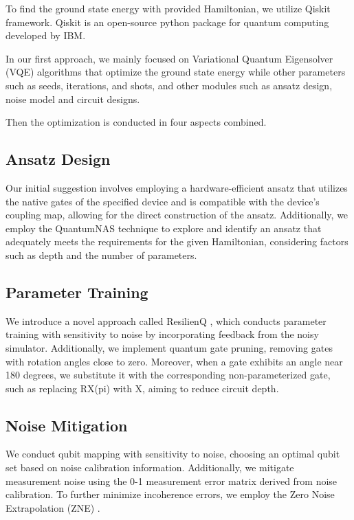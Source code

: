 \documentclass{article}
\begin{document}
To find the ground state energy with provided Hamiltonian, we utilize Qiskit framework. Qiskit is an open-source python package for quantum computing developed by IBM. 

In our first approach, we mainly focused on Variational Quantum Eigensolver (VQE) algorithms that optimize the ground state energy while other parameters such as seeds, iterations, and shots, and other modules such as ansatz design, noise model and circuit designs.

Then the optimization is conducted in four aspects combined. 

\subsection{Ansatz Design}
Our initial suggestion involves employing a hardware-efficient ansatz that utilizes the native gates of the specified device and is compatible with the device's coupling map, allowing for the direct construction of the ansatz. Additionally, we employ the QuantumNAS \cite{QuantumNAS2022} technique to explore and identify an ansatz that adequately meets the requirements for the given Hamiltonian, considering factors such as depth and the number of parameters. 

\subsection{Parameter Training}

We introduce a novel approach called ResilienQ \cite{ResilienQ2023}, which conducts parameter training with sensitivity to noise by incorporating feedback from the noisy simulator. Additionally, we implement quantum gate pruning, removing gates with rotation angles close to zero. Moreover, when a gate exhibits an angle near 180 degrees, we substitute it with the corresponding non-parameterized gate, such as replacing RX(pi) with X, aiming to reduce circuit depth.

\subsection{Noise Mitigation}
We conduct qubit mapping with sensitivity to noise, choosing an optimal qubit set based on noise calibration information. Additionally, we mitigate measurement noise using the 0-1 measurement error matrix derived from noise calibration. To further minimize incoherence errors, we employ the Zero Noise Extrapolation (ZNE) \cite{mitiq2022}.
\end{document}
